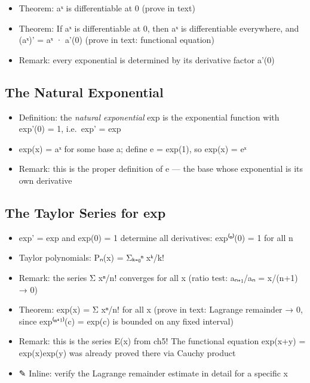 \documentclass[
  10pt,
  letterpaper,
]{scrbook}
\providecommand{\tightlist}{%
  \setlength{\itemsep}{0pt}\setlength{\parskip}{0pt}}
\begin{document}
\begin{itemize}
\tightlist
\item
  Theorem: aˣ is differentiable at 0 (prove in text)
\item
  Theorem: If aˣ is differentiable at 0, then aˣ is differentiable
  everywhere, and (aˣ)' = aˣ · a'(0) (prove in text: functional
  equation)
\item
  Remark: every exponential is determined by its derivative factor a'(0)
\end{itemize}

\subsection{The Natural Exponential}\label{the-natural-exponential}

\begin{itemize}
\tightlist
\item
  Definition: the \emph{natural exponential} exp is the exponential
  function with exp'(0) = 1, i.e.~exp' = exp
\item
  exp(x) = aˣ for some base a; define e = exp(1), so exp(x) = eˣ
\item
  Remark: this is the proper definition of e --- the base whose
  exponential is its own derivative
\end{itemize}

\subsection{The Taylor Series for exp}\label{the-taylor-series-for-exp}

\begin{itemize}
\tightlist
\item
  exp' = exp and exp(0) = 1 determine all derivatives: exp⁽ⁿ⁾(0) = 1 for
  all n
\item
  Taylor polynomials: Pₙ(x) = Σₖ₌₀ⁿ xᵏ/k!
\item
  Remark: the series Σ xⁿ/n! converges for all x (ratio test:
  \textbar aₙ₊₁/aₙ\textbar{} = \textbar x\textbar/(n+1) → 0)
\item
  Theorem: exp(x) = Σ xⁿ/n! for all x (prove in text: Lagrange remainder
  → 0, since \textbar exp⁽ⁿ⁺¹⁾(c)\textbar{} = exp(c) is bounded on any
  fixed interval)
\item
  Remark: this is the series E(x) from ch5! The functional equation
  exp(x+y) = exp(x)exp(y) was already proved there via Cauchy product
\item
  ✎ Inline: verify the Lagrange remainder estimate in detail for a
  specific x
\end{itemize}
\end{document}
